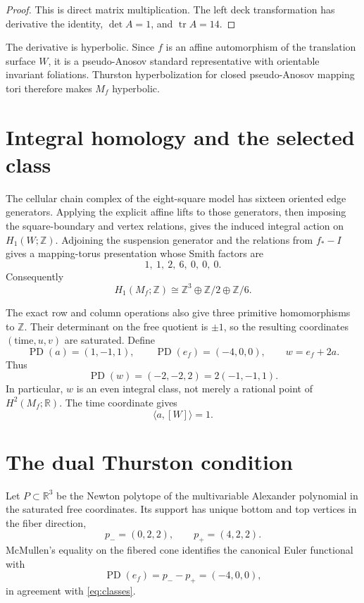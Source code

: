 \documentclass[10pt,reqno]{amsart}
\theoremstyle{definition}
\newcommand{\Z}{\mathbb Z}
\newcommand{\R}{\mathbb R}
\newcommand{\PD}{\operatorname{PD}}
\newcommand{\tr}{\operatorname{tr}}
\begin{document}
\begin{proof}
This is direct matrix multiplication.  The left deck transformation has
derivative the identity, \(\det A=1\), and \(\tr A=14\).
\end{proof}

The derivative is hyperbolic.  Since \(f\) is an affine automorphism of the
translation surface \(W\), it is a pseudo-Anosov standard representative
with orientable invariant foliations.  Thurston hyperbolization for closed
pseudo-Anosov mapping tori therefore makes \(M_f\) hyperbolic.

\section{Integral homology and the selected class}

The cellular chain complex of the eight-square model has sixteen oriented
edge generators.  Applying the explicit affine lifts to those generators,
then imposing the square-boundary and vertex relations, gives the induced
integral action on \(H_1(W;\Z)\).  Adjoining the suspension generator and the
relations from \(f_*-I\) gives a mapping-torus presentation whose Smith
factors are
\begin{equation}\label{eq:smith}
 1,\ 1,\ 2,\ 6,\ 0,\ 0,\ 0.
\end{equation}
Consequently
\[
 H_1(M_f;\Z)\cong\Z^3\oplus\Z/2\oplus\Z/6.
\]

The exact row and column operations also give three primitive homomorphisms
to \(\Z\).  Their determinant on the free quotient is \(\pm1\), so the
resulting coordinates \((\text{time},u,v)\) are saturated.  Define
\begin{equation}\label{eq:classes}
 \PD(a)=(1,-1,1),
 \qquad \PD(e_f)=(-4,0,0),
 \qquad w=e_f+2a.
\end{equation}
Thus
\[
 \PD(w)=(-2,-2,2)=2(-1,-1,1).
\]
In particular, \(w\) is an even integral class, not merely a rational point
of \(H^2(M_f;\R)\).  The time coordinate gives
\begin{equation}\label{eq:fiber-evaluation}
 \langle a,[W]\rangle=1.
\end{equation}

\section{The dual Thurston condition}

Let \(P\subset\R^3\) be the Newton polytope of the multivariable Alexander
polynomial in the saturated free coordinates.  Its support has unique bottom
and top vertices in the fiber direction,
\[
 p_-=(0,2,2),
 \qquad p_+=(4,2,2).
\]
McMullen's equality on the fibered cone identifies the canonical Euler
functional with
\[
 \PD(e_f)=p_--p_+=(-4,0,0),
\]
in agreement with \eqref{eq:classes}.
\end{document}
